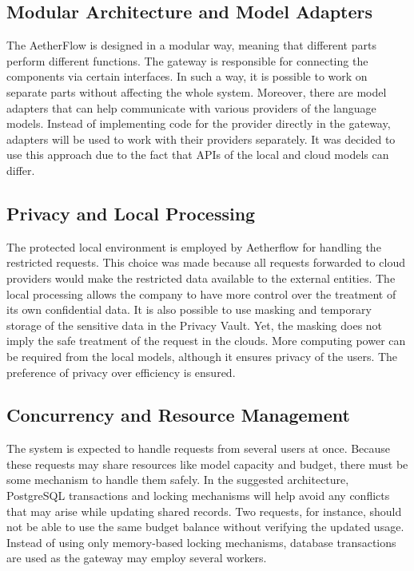 \documentclass{FastFyp}
\begin{document}
\subsection{Modular Architecture and Model Adapters}

The AetherFlow is designed in a modular way, meaning that different parts perform different functions. The gateway is responsible for connecting the components via certain interfaces. In such a way, it is possible to work on separate parts without affecting the whole system.
Moreover, there are model adapters that can help communicate with various providers of the language models. Instead of implementing code for the provider directly in the gateway, adapters will be used to work with their providers separately. It was decided to use this approach due to the fact that APIs of the local and cloud models can differ.

\subsection{Privacy and Local Processing}

The protected local environment is employed by Aetherflow for handling the restricted requests. This choice was made because all requests forwarded to cloud providers would make the restricted data available to the external entities. The local processing allows the company to have more control over the treatment of its own confidential data.
It is also possible to use masking and temporary storage of the sensitive data in the Privacy Vault. Yet, the masking does not imply the safe treatment of the request in the clouds. More computing power can be required from the local models, although it ensures privacy of the users. The preference of privacy over efficiency is ensured.

\subsection{Concurrency and Resource Management}

The system is expected to handle requests from several users at once. Because these requests may share resources like model capacity and budget, there must be some mechanism to handle them safely.
In the suggested architecture, PostgreSQL transactions and locking mechanisms will help avoid any conflicts that may arise while updating shared records. Two requests, for instance, should not be able to use the same budget balance without verifying the updated usage. Instead of using only memory-based locking mechanisms, database transactions are used as the gateway may employ several workers.
\end{document}
